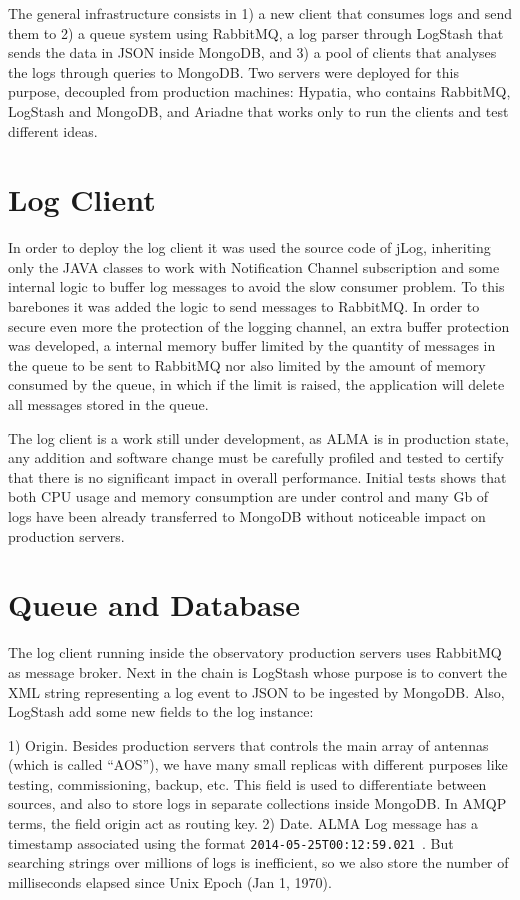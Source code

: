\documentclass[]{spie}  %
\begin{document}
The general infrastructure consists in 1) a new client that consumes logs and
send them to 2) a queue system using RabbitMQ\cite{RabbitMQ}, a log parser through 
LogStash\cite{LogStash} that sends the data in JSON inside MongoDB\cite{mongo}, and 3) a pool of clients that
analyses the logs through queries to MongoDB. Two servers were deployed for
this purpose, decoupled from production machines: Hypatia, who contains
RabbitMQ, LogStash and MongoDB, and Ariadne that works only to run the clients
and test different ideas.

\section{Log Client}
In order to deploy the log client it was used the source code of jLog,
   inheriting only the JAVA classes to work with Notification Channel
   subscription and some internal logic to buffer log messages to avoid the
   slow consumer problem\cite{mora2012alma}. To this barebones it was
   added the logic to send messages to RabbitMQ. In order to secure even more
   the protection of the logging channel, an extra buffer protection was
   developed, a internal memory buffer limited by the quantity of messages in
   the queue to be sent to RabbitMQ nor also limited by the amount of memory
   consumed by the queue, in which if the limit is raised, the application will
   delete all messages stored in the queue.

The log client is a work still under development, as ALMA is in production
state, any addition and software change must be carefully profiled and tested
to certify that there is no significant impact in overall performance. Initial
tests shows that both CPU usage and memory consumption are under control and
many Gb of logs have been already transferred to MongoDB without noticeable
impact on production servers.

\section{Queue and Database}
The log client running inside the observatory production servers uses RabbitMQ
as message broker. Next in the chain is LogStash\cite{LogStash} whose purpose is to
convert the XML string representing a log event to JSON to be ingested by
MongoDB. Also, LogStash add some new fields to the log instance:

1)  Origin. Besides production servers that controls the main array of antennas
(which is called ``AOS''), we have many small replicas with different
purposes like testing, commissioning, backup, etc. This field is used to
differentiate between sources, and also to store logs in separate collections
inside MongoDB. In AMQP terms\cite{AMQP}, the field origin act as routing key.  2)
Date. ALMA Log message has a timestamp associated using the format
{\tt 2014-05-25T00:12:59.021 }. But searching strings over millions of logs
is inefficient, so we also store the number of milliseconds elapsed since Unix
Epoch (Jan 1, 1970).
\end{document}
